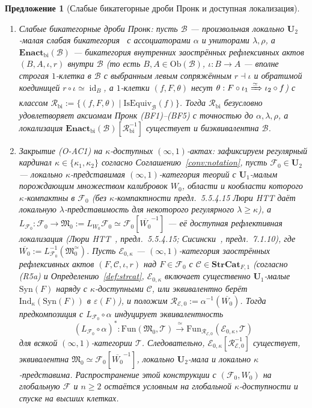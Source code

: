 \documentclass[11pt]{article}
\theoremstyle{plain}
\newtheorem{proposition}[theorem]{Предложение}
\theoremstyle{definition}
\newcommand{\cF}{\mathcal{F}}
\newcommand{\cC}{\mathcal{C}}
\newcommand{\fM}{\mathfrak{M}}
\newcommand{\Ob}{\mathrm{Ob}}
\newcommand{\Fun}{\mathrm{Fun}}
\newcommand{\Syn}{\mathrm{Syn}}
\newcommand{\cE}{\mathcal{E}}
\DeclareMathOperator{\id}{id}
\begin{document}
\begin{proposition}[Слабые бикатегорные дроби Пронк и доступная локализация]\label{prop:ac-oc-accessible-loc}
\begin{enumerate}[nosep,label=(\roman*)]
\item \emph{Слабые бикатегорные дроби Пронк}: пусть $\mathcal{B}$ — произвольная локально $\mathbf{U}_2$-малая слабая бикатегория~\cite{Benabou1967} с ассоциаторами $\alpha$ и униторами $\lambda, \rho$, а $\mathbf{Enact}_{\mathrm{bi}}(\mathcal{B})$ — бикатегория внутренних заострённых рефлексивных актов $(B, A, \iota, r)$ внутри $\mathcal{B}$ (то есть $B, A \in \Ob(\mathcal{B})$, $\iota : B \to A$ — вполне строгая $1$-клетка в $\mathcal{B}$ с выбранным левым сопряжённым $r \dashv \iota$ и обратимой коединицей $r \circ \iota \simeq \id_B$, а $1$-клетки $(f, F, \theta)$ несут $\theta : F \circ \iota_1 \xRightarrow{\simeq} \iota_2 \circ f$) с классом $\mathcal{R}_{\mathrm{bi}} := \allowbreak \{(f, F, \theta) \mid\allowbreak \mathrm{IsEquiv}_{\mathcal{B}}(f)\}$. Тогда $\mathcal{R}_{\mathrm{bi}}$ безусловно удовлетворяет аксиомам Пронк \textup{(BF1)--(BF5)} с точностью до $\alpha, \lambda, \rho$, а локализация $\mathbf{Enact}_{\mathrm{bi}}(\mathcal{B})\allowbreak[\mathcal{R}_{\mathrm{bi}}^{-1}]$ существует и биэквивалентна $\mathcal{B}$.
\item \emph{Закрытие \textup{(O-AC1)} на $\kappa$-доступных $(\infty, 1)$-актах}: зафиксируем регулярный кардинал $\kappa \in \{\kappa_1, \kappa_2\}$ согласно Соглашению~\ref{conv:notation}, пусть $\cF_0 \in \mathbf{U}_2$ — локально $\kappa$-представимая $(\infty, 1)$-категория теорий с $\mathbf{U}_1$-малым порождающим множеством калибровок $W_0$, области и кообласти которого $\kappa$-компактны в $\cF_0$ (без $\kappa$-компактности предл.~5.5.4.15 Люри HTT даёт локальную $\lambda$-представимость для некоторого регулярного $\lambda \ge \kappa$), а $L_{\cF_0} : \cF_0 \to \fM_0 := L_{W_0}\cF_0 \simeq \cF_0[\overline{W_0}^{-1}]$ — её доступная рефлективная локализация (Люри HTT~\cite{LurieHTT}, предл.~5.5.4.15; Сисински~\cite{Cisinski2019}, предл.~7.1.10), где $\overline{W_0} := L_{\cF_0}^{-1}(\fM_0^{\simeq})$. Пусть $\cE_{0, \kappa}$ — $(\infty, 1)$-категория заострённых рефлексивных актов $(F, \cC, \iota, r)$ над $F \in \cF_0$ с $\cC \in \mathbf{StrCat}_{F, 1}$ (согласно \textup{(R5a)} и Определению~\ref{def:strcat}, $\cE_{0, \kappa}$ включает существенно $\mathbf{U}_1$-малые $\Syn(F)$ наряду с $\kappa$-доступными $\cC$, или эквивалентно берёт $\mathrm{Ind}_\kappa(\Syn(F))$ в $\varepsilon(F)$), и положим $\mathcal{R}_{\cE, 0} := \alpha^{-1}(\overline{W_0})$. Тогда предкомпозиция с $L_{\cF_0} \circ \alpha$ индуцирует эквивалентность
\[
  (L_{\cF_0} \circ \alpha)^* : \Fun(\fM_0, \mathcal{T}) \xrightarrow{\;\simeq\;} \Fun_{\mathcal{R}_{\cE, 0}}(\cE_{0, \kappa}, \mathcal{T})
\]
для всякой $(\infty, 1)$-категории $\mathcal{T}$. Следовательно, $\cE_{0, \kappa}[\mathcal{R}_{\cE, 0}^{-1}]$ существует, эквивалентна $\fM_0 \simeq \cF_0[\overline{W_0}^{-1}]$, локально $\mathbf{U}_2$-мала и локально $\kappa$-представима. Распространение этой конструкции с $(\cF_0, W_0)$ на глобальную $\cF$ и $n \ge 2$ остаётся условным на глобальной $\kappa$-доступности и спуске на высших клетках.
\end{enumerate}
\end{proposition}
\end{document}
